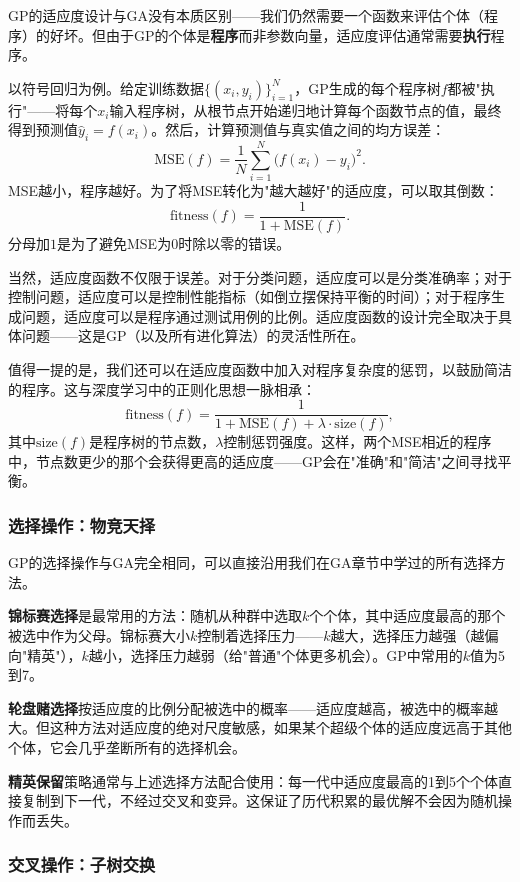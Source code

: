 \documentclass[lang=cn,zihao=-4,a4paper,fontset=windows]{beautybook}
\begin{document}
GP的适应度设计与GA没有本质区别——我们仍然需要一个函数来评估个体（程序）的好坏。但由于GP的个体是\textbf{程序}而非参数向量，适应度评估通常需要\textbf{执行}程序。

以符号回归为例。给定训练数据$\{(x_i, y_i)\}_{i=1}^{N}$，GP生成的每个程序树$f$都被"执行"——将每个$x_i$输入程序树，从根节点开始递归地计算每个函数节点的值，最终得到预测值$\hat{y}_i = f(x_i)$。然后，计算预测值与真实值之间的均方误差：
\[
\text{MSE}(f) = \frac{1}{N}\sum_{i=1}^{N}\big(f(x_i) - y_i\big)^2.
\]
MSE越小，程序越好。为了将MSE转化为"越大越好"的适应度，可以取其倒数：
\[
\text{fitness}(f) = \frac{1}{1 + \text{MSE}(f)}.
\]
分母加$1$是为了避免MSE为0时除以零的错误。

当然，适应度函数不仅限于误差。对于分类问题，适应度可以是分类准确率；对于控制问题，适应度可以是控制性能指标（如倒立摆保持平衡的时间）；对于程序生成问题，适应度可以是程序通过测试用例的比例。适应度函数的设计完全取决于具体问题——这是GP（以及所有进化算法）的灵活性所在。

值得一提的是，我们还可以在适应度函数中加入对程序复杂度的惩罚，以鼓励简洁的程序。这与深度学习中的正则化思想一脉相承：
\[
\text{fitness}(f) = \frac{1}{1 + \text{MSE}(f) + \lambda \cdot \text{size}(f)},
\]
其中$\text{size}(f)$是程序树的节点数，$\lambda$控制惩罚强度。这样，两个MSE相近的程序中，节点数更少的那个会获得更高的适应度——GP会在"准确"和"简洁"之间寻找平衡。

\subsubsection{选择操作：物竞天择}

GP的选择操作与GA完全相同，可以直接沿用我们在GA章节中学过的所有选择方法。

\textbf{锦标赛选择}是最常用的方法：随机从种群中选取$k$个个体，其中适应度最高的那个被选中作为父母。锦标赛大小$k$控制着选择压力——$k$越大，选择压力越强（越偏向"精英"），$k$越小，选择压力越弱（给"普通"个体更多机会）。GP中常用的$k$值为5到7。

\textbf{轮盘赌选择}按适应度的比例分配被选中的概率——适应度越高，被选中的概率越大。但这种方法对适应度的绝对尺度敏感，如果某个超级个体的适应度远高于其他个体，它会几乎垄断所有的选择机会。

\textbf{精英保留}策略通常与上述选择方法配合使用：每一代中适应度最高的1到5个个体直接复制到下一代，不经过交叉和变异。这保证了历代积累的最优解不会因为随机操作而丢失。

\subsubsection{交叉操作：子树交换}
\end{document}
